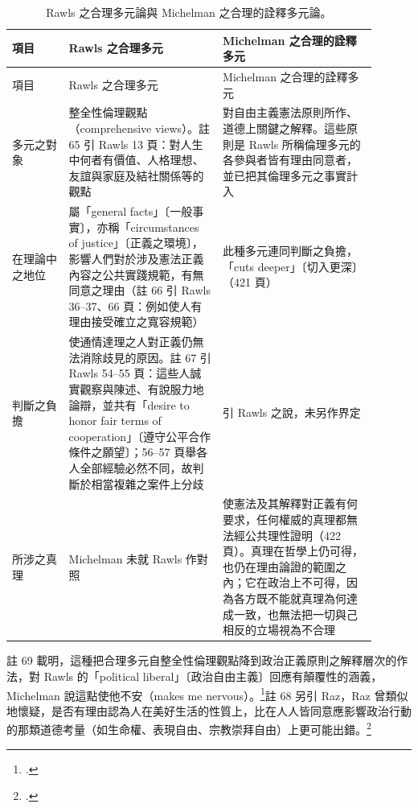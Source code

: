 \begin{longtable}{@{}L{0.14\linewidth}L{0.38\linewidth}L{0.38\linewidth}@{}}
\caption{Rawls 之合理多元論與 Michelman 之合理的詮釋多元論。}\label{tab:40_paradox-pluralism}\\
\toprule
項目 & Rawls 之合理多元 & Michelman 之合理的詮釋多元 \\
\midrule
\endfirsthead
\toprule
項目 & Rawls 之合理多元 & Michelman 之合理的詮釋多元 \\
\midrule
\endhead
多元之對象 & 整全性倫理觀點（comprehensive views）。註 65 引 Rawls 13 頁：對人生中何者有價值、人格理想、友誼與家庭及結社關係等的觀點 & 對自由主義憲法原則所作、道德上關鍵之解釋。這些原則是 Rawls 所稱倫理多元的各參與者皆有理由同意者，並已把其倫理多元之事實計入 \\
在理論中之地位 & 屬「general facts」〔一般事實〕，亦稱「circumstances of justice」〔正義之環境〕，影響人們對於涉及憲法正義內容之公共實踐規範，有無同意之理由（註 66 引 Rawls 36--37、66 頁：例如使人有理由接受確立之寬容規範） & 此種多元連同判斷之負擔，「cuts deeper」〔切入更深〕（421 頁） \\
判斷之負擔 & 使通情達理之人對正義仍無法消除歧見的原因。註 67 引 Rawls 54--55 頁：這些人誠實觀察與陳述、有說服力地論辯，並共有「desire to honor fair terms of cooperation」〔遵守公平合作條件之願望〕；56--57 頁舉各人全部經驗必然不同，故判斷於相當複雜之案件上分歧 & 引 Rawls 之說，未另作界定 \\
所涉之真理 & Michelman 未就 Rawls 作對照 & 使憲法及其解釋對正義有何要求，任何權威的真理都無法經公共理性證明（422 頁）。真理在哲學上仍可得，也仍在理由論證的範圍之內；它在政治上不可得，因為各方既不能就真理為何達成一致，也無法把一切與己相反的立場視為不合理 \\
\bottomrule
\end{longtable}

註 69 載明，這種把合理多元自整全性倫理觀點降到政治正義原則之解釋層次的作法，對 Rawls 的「political liberal」〔政治自由主義〕回應有顛覆性的涵義，Michelman 說這點使他不安（makes me nervous）。\footcite[422 n.69]{michelman1998}註 68 另引 Raz，Raz 曾類似地懷疑，是否有理由認為人在美好生活的性質上，比在人人皆同意應影響政治行動的那類道德考量（如生命權、表現自由、宗教崇拜自由）上更可能出錯。\footcite[422 n.68]{michelman1998}

